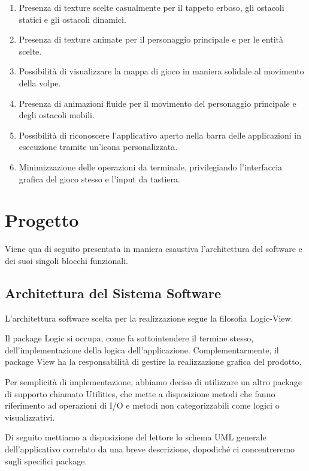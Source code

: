 \documentclass[12pt,a4paper]{report}
\begin{document}
\begin{enumerate}
  \item Presenza di texture scelte casualmente per il tappeto erboso, gli ostacoli statici e gli ostacoli dinamici.
  \item Presenza di texture animate per il personaggio principale e per le entità scelte.
  \item Possibilità di visualizzare la mappa di gioco in maniera solidale al movimento della volpe.
  \item Presenza di animazioni fluide per il movimento del personaggio principale e degli ostacoli mobili.
  \item Possibilità di riconoscere l'applicativo aperto nella barra delle applicazioni in esecuzione tramite un'icona personalizzata.
  \item Minimizzazione delle operazioni da terminale, privilegiando l'interfaccia grafica del gioco stesso e l'input da tastiera.
\end{enumerate}

\chapter{Progetto}\label{ch:prog}
Viene qua di seguito presentata in maniera esaustiva l'architettura del software e dei suoi singoli blocchi funzionali.

\section{Architettura del Sistema Software}\label{ch:arch}
L'architettura software scelta per la realizzazione segue la filosofia Logic-View.

Il package Logic si occupa, come fa sottointendere il termine stesso, dell'implementazione della logica dell'applicazione. Complementarmente, il package View ha la responsabilità di gestire la realizzazione grafica del prodotto.

Per semplicità di implementazione, abbiamo deciso di utilizzare un altro package di supporto chiamato Utilities, che mette a disposizione metodi che fanno riferimento ad operazioni di I/O e metodi non categorizzabili come logici o visualizzativi.

Di seguito mettiamo a disposizione del lettore lo schema UML generale dell'applicativo correlato da una breve descrizione, dopodiché ci concentreremo sugli specifici package.
\end{document}
